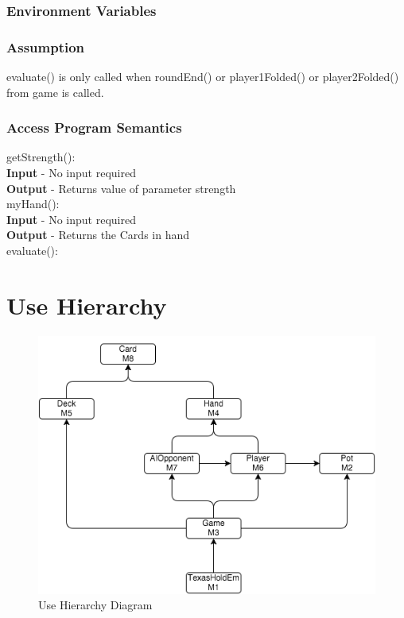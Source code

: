 \documentclass[11pt]{article}
\begin{document}
    \subsubsection{Environment Variables}
    \subsubsection{Assumption}
    evaluate() is only called when roundEnd() or player1Folded() or player2Folded() from game is called.
    \subsubsection{Access Program Semantics}
    getStrength():\\
    \textbf{Input} - No input required\\
    \textbf{Output} - Returns value of parameter strength\\
    myHand():\\
    \textbf{Input} - No input required\\
    \textbf{Output} - Returns the Cards in hand\\
    evaluate():\\
 	
    \section{Use Hierarchy}
    \begin{figure}[h]
		\includegraphics[scale=0.7]{Uses.png}
		\caption{Use Hierarchy Diagram}
		\label{fig1: Figure1}
		\end{figure}
\end{document}
